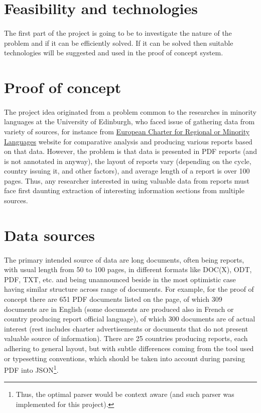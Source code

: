 \documentclass[a4paper]{tufte-book}
\begin{document}
\section{Feasibility and technologies}
\paragraph{}
The first part of the project is going to be to investigate the nature of the problem and if it can be efficiently solved. If it can be solved then suitable technologies will be suggested and used in the proof of concept system.

\section{Proof of concept}
\paragraph{}
The project idea originated from a problem common to the researches in minority languages at the University of Edinburgh, who faced issue of gathering data from variety of sources, for instance from \href{http://www.coe.int/t/dg4/education/minlang/Report/default_en.asp}{European Charter for Regional or Minority Languages} website for comparative analysis and producing various reports based on that data. However, the problem is that data is presented in PDF reports (and is not annotated in anyway), the layout of reports vary (depending on the cycle, country issuing it, and other factors), and average length of a report is over 100 pages. Thus, any researcher interested in using valuable data from reports must face first daunting extraction of interesting information sections from multiple sources.

\section{Data sources}
\paragraph{}
The primary intended source of data are long documents, often being reports, with usual length from 50 to 100 pages, in different formats like DOC(X), ODT, PDF, TXT, etc. and being unannounced beside in the most optimistic case having similar structure across range of documents. For example, for the proof of concept there are 651 PDF documents listed on the page, of which 309 documents are in English (some documents are produced also in French or country producing report official language), of which 300 documents are of actual interest (rest includes charter advertisements or documents that do not present valuable source of information). There are 25 countries producing reports, each adhering to general layout, but with subtle differences coming from the tool used or typesetting conventions, which should be taken into account during parsing PDF into JSON\footnote{Thus, the optimal parser would be context aware (and such parser was implemented for this project).}.
\end{document}
